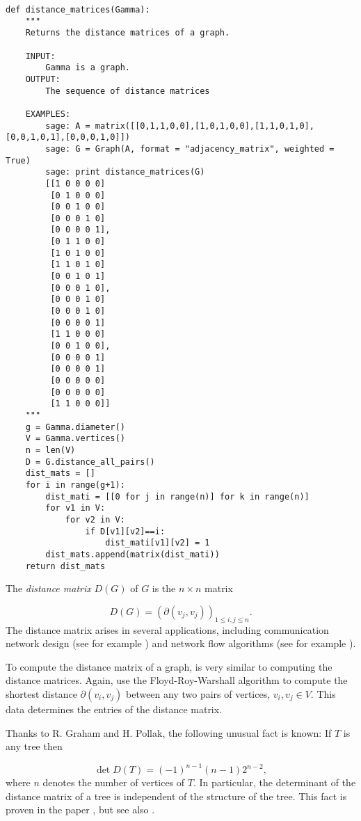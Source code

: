 \begin{lstlisting}
def distance_matrices(Gamma):
    """
    Returns the distance matrices of a graph.

    INPUT:
        Gamma is a graph.
    OUTPUT:
        The sequence of distance matrices

    EXAMPLES:
        sage: A = matrix([[0,1,1,0,0],[1,0,1,0,0],[1,1,0,1,0],[0,0,1,0,1],[0,0,0,1,0]])
        sage: G = Graph(A, format = "adjacency_matrix", weighted = True)
        sage: print distance_matrices(G)
        [[1 0 0 0 0]
         [0 1 0 0 0]
         [0 0 1 0 0]
         [0 0 0 1 0]
         [0 0 0 0 1],
         [0 1 1 0 0]
         [1 0 1 0 0]
         [1 1 0 1 0]
         [0 0 1 0 1]
         [0 0 0 1 0],
         [0 0 0 1 0]
         [0 0 0 1 0]
         [0 0 0 0 1]
         [1 1 0 0 0]
         [0 0 1 0 0],
         [0 0 0 0 1]
         [0 0 0 0 1]
         [0 0 0 0 0]
         [0 0 0 0 0]
         [1 1 0 0 0]]
    """
    g = Gamma.diameter()
    V = Gamma.vertices()
    n = len(V)
    D = G.distance_all_pairs()
    dist_mats = []
    for i in range(g+1):
        dist_mati = [[0 for j in range(n)] for k in range(n)]
        for v1 in V:
            for v2 in V:
                if D[v1][v2]==i:
                    dist_mati[v1][v2] = 1
        dist_mats.append(matrix(dist_mati))
    return dist_mats
\end{lstlisting}

The {\it distance matrix} $D(G)$ of $G$ is
the $n\times n$ matrix

\[
D(G)=(\partial(v_j,v_j))_{1\leq i,j\leq n}.
\]
The distance matrix arises in several applications, including
communication network design (see for example
\cite{GrahamPollak1971})
and network flow algorithms (see for example \cite{Dijkstra1959}).

To compute the distance matrix of a graph, is very
similar to computing the distance matrices.
Again, use the Floyd-Roy-Warshall
algorithm to compute the shortest distance
$\partial(v_i,v_j)$ between any two pairs of vertices,
$v_i,v_j\in V$. This data determines the entries of
the distance matrix.

\begin{remark}
{\rm
Thanks to R. Graham and H. Pollak, the following unusual fact is
known:
If $T$ is any tree then

\[
\det D(T)=(-1)^{n-1}(n-1)2^{n-2},
\]
where $n$ denotes the number of vertices of $T$.
In particular, the determinant of the distance matrix of a tree is
independent of the structure of the tree.  This fact is proven in the
paper \cite{GrahamPollak1971}, but see also
\cite{EdelbergEtAl1976}.
}
\end{remark}

